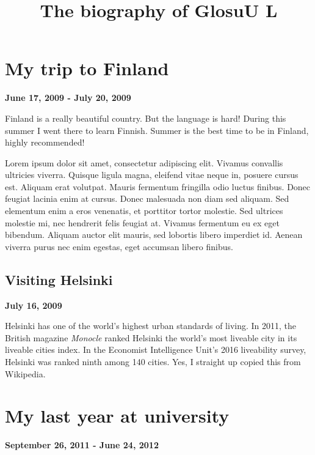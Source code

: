 \documentclass[12pt, a4paper]{article}
\title{The biography of GlosuU L}
\date{}
\begin{document}
\maketitle
\newpage
\tableofcontents
\newpage

\section{My trip to Finland}
\begin{center}
\textbf{June 17, 2009 - July 20, 2009}
\end{center}
\vspace{3mm}

Finland is a really beautiful country. But the language is hard! During this summer I went there to learn Finnish. Summer is the best time to be in Finland, highly recommended!

Lorem ipsum dolor sit amet, consectetur adipiscing elit. Vivamus convallis ultricies viverra. Quisque ligula magna, eleifend vitae neque in, posuere cursus est. Aliquam erat volutpat. Mauris fermentum fringilla odio luctus finibus. Donec feugiat lacinia enim at cursus. Donec malesuada non diam sed aliquam. Sed elementum enim a eros venenatis, et porttitor tortor molestie. Sed ultrices molestie mi, nec hendrerit felis feugiat at. Vivamus fermentum eu ex eget bibendum. Aliquam auctor elit mauris, sed lobortis libero imperdiet id. Aenean viverra purus nec enim egestas, eget accumsan libero finibus.

\subsection{Visiting Helsinki}
\begin{center}
\textbf{July 16, 2009}
\end{center}
\vspace{3mm}

Helsinki has one of the world's highest urban standards of living. In 2011, the British magazine \textit{Monocle} ranked Helsinki the world's most liveable city in its liveable cities index. In the Economist Intelligence Unit's 2016 liveability survey, Helsinki was ranked ninth among 140 cities. Yes, I straight up copied this from Wikipedia.

\section{My last year at university}
\begin{center}
\textbf{September 26, 2011 - June 24, 2012}
\end{center}
\vspace{3mm}
\end{document}
